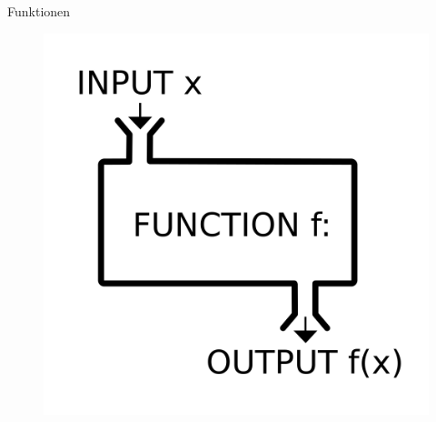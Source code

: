 \begin{frame}{Funktionen}
\begin{figure}[h]
    \centering
    \includegraphics*[width=0.7\linewidth, keepaspectratio]{images/function-machine.png}
\end{figure}
\end{frame}
